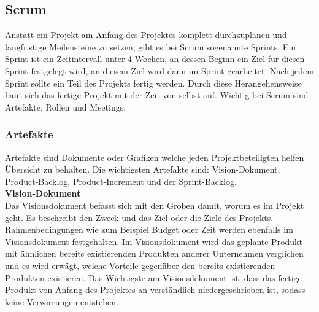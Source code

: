 	\subsection{Scrum}
	Anstatt ein Projekt am Anfang des Projektes komplett durchzuplanen und langfristige Meilensteine zu setzen, gibt es bei Scrum sogenannte Sprints. Ein Sprint ist ein Zeitintervall unter 4 Wochen, an dessen Beginn ein Ziel für diesen Sprint festgelegt wird, an diesem Ziel wird dann im Sprint gearbeitet. Nach jedem Sprint sollte ein Teil des Projekts fertig werden. Durch diese Herangehensweise baut sich das fertige Projekt mit der Zeit von selbst auf. Wichtig bei Scrum sind Artefakte, Rollen und Meetings.
	\subsubsection{Artefakte}
	\label{sec:Artefakte}
		Artefakte sind Dokumente oder Grafiken welche jeden Projektbeteiligten helfen Übersicht zu behalten. Die wichtigsten Artefakte sind: Vision-Dokument, Product-Backlog, Product-Increment und der Sprint-Backlog.\\
		
			\textbf{Vision-Dokument}\\
				Das Visionsdokument befasst sich mit den Groben damit, worum es im Projekt geht. Es beschreibt den Zweck und das Ziel oder die Ziele des Projekts. Rahmenbedingungen wie zum Beispiel Budget oder Zeit werden ebenfalls im Visionsdokument festgehalten. Im Visionsdokument wird das geplante Produkt mit ähnlichen bereits existierenden Produkten anderer Unternehmen verglichen und es wird erwägt, welche Vorteile gegenüber den bereits existierenden Produkten existieren.
			Das Wichtigste am Visionsdokument ist, dass das fertige Produkt von Anfang des Projektes an verständlich niedergeschrieben ist, sodass keine Verwirrungen entstehen. \\ 
						
